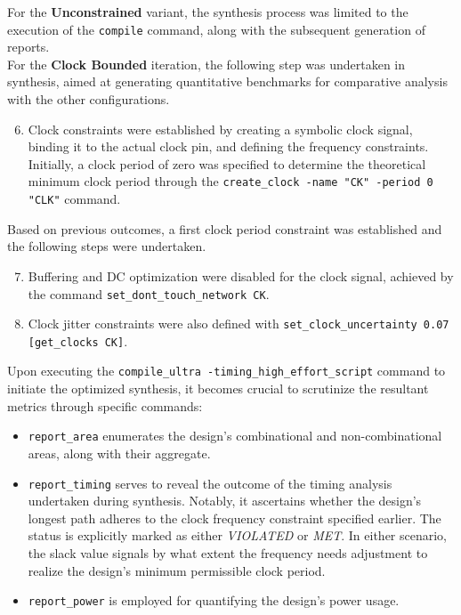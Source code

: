For the \textbf{Unconstrained} variant, the synthesis process was limited to the execution of the \texttt{compile} command, along with the subsequent generation of reports. \\

For the \textbf{Clock Bounded} iteration, the following step was undertaken in synthesis, aimed at generating quantitative benchmarks for comparative analysis with the other configurations.

\begin{enumerate}
\setcounter{enumi}{5}

	\item Clock constraints were established by creating a symbolic clock signal, binding it to the actual clock pin, and defining the frequency constraints. Initially, a clock period of zero was specified to determine the theoretical minimum clock period through the \texttt{create\_clock -name "CK" -period 0 {"CLK"}} command.

\end{enumerate}

Based on previous outcomes, a first clock period constraint was established and the following steps were undertaken.

\begin{enumerate}
\setcounter{enumi}{6}

	\item Buffering and DC optimization were disabled for the clock signal, achieved by the command \texttt{set\_dont\_touch\_network CK}.
	
	\item Clock jitter constraints were also defined with \texttt{set\_clock\_uncertainty 0.07 [get\_clocks CK]}.

\end{enumerate}

Upon executing the \texttt{compile\_ultra -timing\_high\_effort\_script} command to initiate the optimized synthesis, it becomes crucial to scrutinize the resultant metrics through specific commands:
\begin{itemize}

	\item \texttt{report\_area} enumerates the design's combinational and non-combinational areas, along with their aggregate.

	\item \texttt{report\_timing} serves to reveal the outcome of the timing analysis undertaken during synthesis. Notably, it ascertains whether the design's longest path adheres to the clock frequency constraint specified earlier. The status is explicitly marked as either \textit{VIOLATED} or \textit{MET}. In either scenario, the slack value signals by what extent the frequency needs adjustment to realize the design's minimum permissible clock period.

	\item \texttt{report\_power} is employed for quantifying the design's power usage.

\end{itemize}

